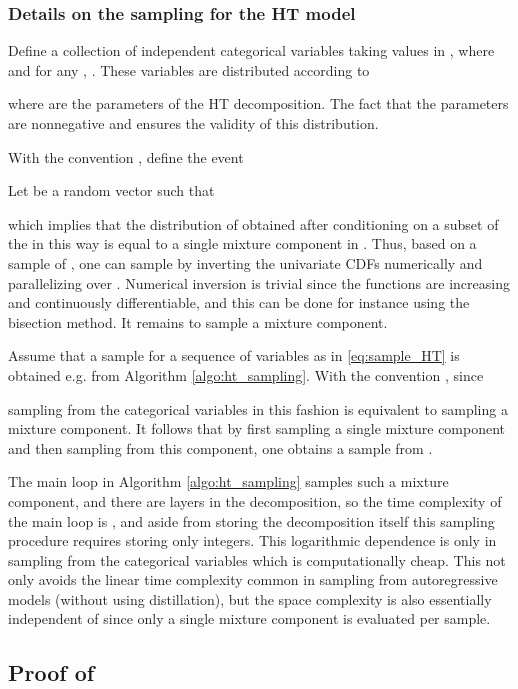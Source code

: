 \documentclass{article}
\begin{document}
\subsubsection{Details on the sampling for the HT model}
Define a collection of independent categorical variables  taking values in , where  and for any , . These variables are distributed according to  

where  are the parameters of the HT decomposition. The fact that the parameters are nonnegative and  ensures the validity of this distribution.

With the convention , define the event

Let  be a random vector such that

which implies that the distribution of  obtained after conditioning on a subset of the  in this way is equal to a single mixture component in .
Thus, based on a sample of , one can sample  by inverting the univariate CDFs  numerically and parallelizing over . 
Numerical inversion is trivial since the functions are increasing and continuously differentiable, and this can be done for instance using the bisection method.
It remains to sample a mixture component.

Assume that a sample  for a sequence of variables as in \cref{eq:sample_HT} is obtained e.g. from Algorithm \ref{algo:ht_sampling}.
With the convention , since 

sampling from the categorical variables in this fashion is equivalent to sampling a mixture component.
It follows that by first sampling a single mixture component and then sampling from this component, one obtains a sample from . 

The main loop in Algorithm \ref{algo:ht_sampling} samples such a mixture component, and there are  layers in the decomposition, so the time complexity of the main loop is , and aside from storing the decomposition itself this sampling procedure requires storing only  integers. This logarithmic dependence is only in sampling from the categorical variables which is computationally cheap. This not only avoids the linear time complexity common in sampling from autoregressive models (without using distillation), but the space complexity is also essentially independent of  since only a single mixture component is evaluated per sample. 





\subsection{Proof of }
\end{document}
